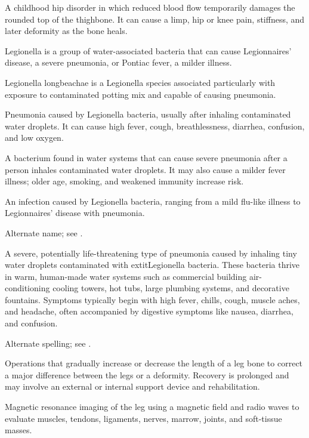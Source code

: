  A childhood hip disorder in which reduced blood flow temporarily damages the rounded top of the thighbone. It can cause a limp, hip or knee pain, stiffness, and later deformity as the bone heals.

 Legionella is a group of water-associated bacteria that can cause Legionnaires' disease, a severe pneumonia, or Pontiac fever, a milder illness.

 Legionella longbeachae is a Legionella species associated particularly with exposure to contaminated potting mix and capable of causing pneumonia.

 Pneumonia caused by Legionella bacteria, usually after inhaling contaminated water droplets. It can cause high fever, cough, breathlessness, diarrhea, confusion, and low oxygen.

 A bacterium found in water systems that can cause severe pneumonia after a person inhales contaminated water droplets. It may also cause a milder fever illness; older age, smoking, and weakened immunity increase risk.

 An infection caused by Legionella bacteria, ranging from a mild flu-like illness to Legionnaires’ disease with pneumonia.

 Alternate name; see .

 A severe, potentially life-threatening type of pneumonia caused by inhaling tiny water droplets contaminated with  extit{Legionella} bacteria. These bacteria thrive in warm, human-made water systems such as commercial building air-conditioning cooling towers, hot tubs, large plumbing systems, and decorative fountains. Symptoms typically begin with high fever, chills, cough, muscle aches, and headache, often accompanied by digestive symptoms like nausea, diarrhea, and confusion.

 Alternate spelling; see .

 Operations that gradually increase or decrease the length of a leg bone to correct a major difference between the legs or a deformity. Recovery is prolonged and may involve an external or internal support device and rehabilitation.

 Magnetic resonance imaging of the leg using a magnetic field and radio waves to evaluate muscles, tendons, ligaments, nerves, marrow, joints, and soft-tissue masses.

